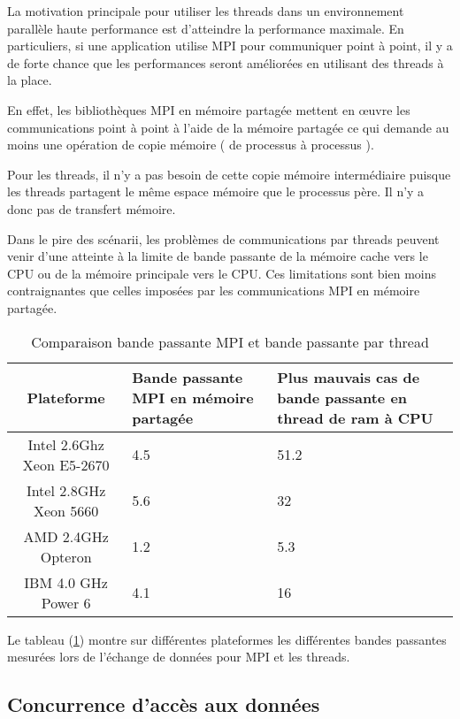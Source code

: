 \documentclass[fleqn,11pt]{article}
\begin{document}
La motivation principale pour utiliser les threads dans un environnement parallèle haute performance est d'atteindre la performance maximale. En particuliers, si une application utilise MPI pour communiquer point à point, il y a de forte chance que les performances seront améliorées en utilisant des threads à la place.

En effet, les bibliothèques MPI en mémoire partagée mettent en {\oe}uvre les communications point à point à l'aide de la mémoire partagée ce qui demande au moins une opération de copie mémoire ( de processus à processus ).

Pour les threads, il n'y a pas besoin de cette copie mémoire intermédiaire puisque les threads partagent le même espace mémoire que le processus père. Il n'y a donc pas de transfert mémoire.

Dans le pire des scénarii, les problèmes de communications par threads peuvent venir d'une atteinte à la limite
de bande passante de la mémoire cache vers le CPU ou de la mémoire principale vers le CPU. Ces limitations sont bien moins contraignantes que celles imposées par les communications MPI en mémoire partagée.

\begin{table}[h]
 \begin{center}
  \begin{tabular}{|c|p{4cm}|p{4cm}|}\hline
   \rowcolor{lightgray!50} Plateforme & Bande passante MPI en mémoire partagée & Plus mauvais cas de bande passante en thread de ram à CPU \\ \hline
  Intel 2.6Ghz Xeon E5-2670 & 4.5 & 51.2 \\ \hline
  \rowcolor{lightgray!25}Intel 2.8GHz Xeon 5660 & 5.6 & 32 \\ \hline
  AMD   2.4GHz Opteron & 1.2 & 5.3 \\ \hline
 \rowcolor{lightgray!25}IBM 4.0 GHz Power 6 & 4.1 & 16 \\ \hline
  \end{tabular}
 \end{center}
  \caption{Comparaison bande passante MPI et bande passante par thread}
  \label{tab::compMPIpt}
\end{table}


Le tableau (\ref{tab::compMPIpt}) 
montre sur différentes plateformes les différentes bandes passantes mesurées lors de l'échange de données pour MPI et les threads.

\subsection{Concurrence d'accès aux données}
\end{document}
